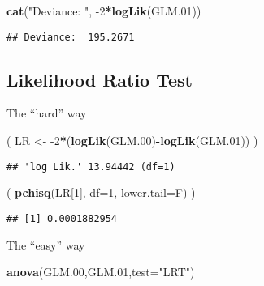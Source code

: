 \documentclass[
]{article}
\newenvironment{Shaded}{\begin{snugshade}}{\end{snugshade}}
\newcommand{\DataTypeTok}[1]{\textcolor[rgb]{0.13,0.29,0.53}{#1}}
\newcommand{\DecValTok}[1]{\textcolor[rgb]{0.00,0.00,0.81}{#1}}
\newcommand{\FloatTok}[1]{\textcolor[rgb]{0.00,0.00,0.81}{#1}}
\newcommand{\KeywordTok}[1]{\textcolor[rgb]{0.13,0.29,0.53}{\textbf{#1}}}
\newcommand{\NormalTok}[1]{#1}
\newcommand{\OperatorTok}[1]{\textcolor[rgb]{0.81,0.36,0.00}{\textbf{#1}}}
\newcommand{\StringTok}[1]{\textcolor[rgb]{0.31,0.60,0.02}{#1}}
\begin{document}
\begin{Shaded}
\begin{Highlighting}[]
\KeywordTok{cat}\NormalTok{(}\StringTok{"Deviance: "}\NormalTok{, }\DecValTok{-2}\OperatorTok{*}\KeywordTok{logLik}\NormalTok{(GLM}\FloatTok{.01}\NormalTok{))}
\end{Highlighting}
\end{Shaded}

\begin{verbatim}
## Deviance:  195.2671
\end{verbatim}

\hypertarget{likelihood-ratio-test}{%
\subsection{Likelihood Ratio Test}\label{likelihood-ratio-test}}

The ``hard'' way

\begin{Shaded}
\begin{Highlighting}[]
\NormalTok{( LR <-}\StringTok{ }\DecValTok{-2}\OperatorTok{*}\NormalTok{(}\KeywordTok{logLik}\NormalTok{(GLM}\FloatTok{.00}\NormalTok{)}\OperatorTok{-}\KeywordTok{logLik}\NormalTok{(GLM}\FloatTok{.01}\NormalTok{)) )}
\end{Highlighting}
\end{Shaded}

\begin{verbatim}
## 'log Lik.' 13.94442 (df=1)
\end{verbatim}

\begin{Shaded}
\begin{Highlighting}[]
\NormalTok{( }\KeywordTok{pchisq}\NormalTok{(LR[}\DecValTok{1}\NormalTok{], }\DataTypeTok{df=}\DecValTok{1}\NormalTok{, }\DataTypeTok{lower.tail=}\NormalTok{F) )}
\end{Highlighting}
\end{Shaded}

\begin{verbatim}
## [1] 0.0001882954
\end{verbatim}

The ``easy'' way

\begin{Shaded}
\begin{Highlighting}[]
\KeywordTok{anova}\NormalTok{(GLM}\FloatTok{.00}\NormalTok{,GLM}\FloatTok{.01}\NormalTok{,}\DataTypeTok{test=}\StringTok{"LRT"}\NormalTok{)}
\end{Highlighting}
\end{Shaded}
\end{document}
